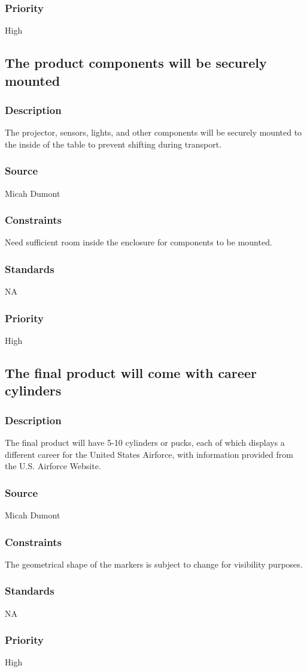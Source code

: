 \subsubsection{Priority}
High

\subsection{The product components will be securely mounted}
\subsubsection{Description}
The projector, sensors, lights, and other components will be securely mounted to the inside of the table to prevent shifting during transport.
\subsubsection{Source}
Micah Dumont
\subsubsection{Constraints}
Need sufficient room inside the enclosure for components to be mounted.
\subsubsection{Standards}
NA
\subsubsection{Priority}
High

\subsection{The final product will come with career cylinders}
\subsubsection{Description}
The final product will have 5-10 cylinders or pucks, each of which displays a different career for the United States Airforce, with information provided from the U.S. Airforce Website.
\subsubsection{Source}
Micah Dumont
\subsubsection{Constraints}
The geometrical shape of the markers is subject to change for visibility purposes.
\subsubsection{Standards}
NA
\subsubsection{Priority}
High